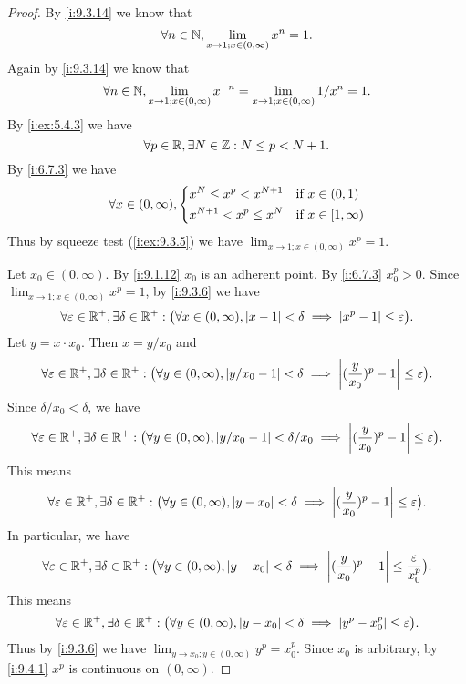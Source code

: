 \begin{proof}
  By \cref{i:9.3.14} we know that
  \[
    \forall n \in \mathbb{N}, \lim_{x \to 1 ; x \in (0, \infty)} x^n = 1.
  \]
  Again by \cref{i:9.3.14} we know that
  \[
    \forall n \in \mathbb{N}, \lim_{x \to 1 ; x \in (0, \infty)} x^{-n} = \lim_{x \to 1 ; x \in (0, \infty)} 1 / x^n = 1.
  \]
  By \cref{i:ex:5.4.3} we have
  \[
    \forall p \in \mathbb{R}, \exists N \in \mathbb{Z} : N \leq p < N + 1.
  \]
  By \cref{i:6.7.3} we have
  \[
    \forall x \in (0, \infty), \begin{dcases}
      x^N \leq x^p < x^{N + 1}   & \text{if } x \in (0, 1)      \\
      x^{N + 1} < x^p \leq x^{N} & \text{if } x \in [1, \infty)
    \end{dcases}
  \]
  Thus by squeeze test (\cref{i:ex:9.3.5}) we have \(\lim_{x \to 1 ; x \in (0, \infty)} x^p = 1\).

  Let \(x_0 \in (0, \infty)\).
  By \cref{i:9.1.12} \(x_0\) is an adherent point.
  By \cref{i:6.7.3} \(x_0^p > 0\).
  Since \(\lim_{x \to 1 ; x \in (0, \infty)} x^p = 1\), by \cref{i:9.3.6} we have
  \[
    \forall \varepsilon \in \mathbb{R}^+, \exists \delta \in \mathbb{R}^+ : \big(\forall x \in (0, \infty), \left\lvert x - 1\right\rvert < \delta \implies \left\lvert x^p - 1\right\rvert \leq \varepsilon\big).
  \]
  Let \(y = x \cdot x_0\).
  Then \(x = y / x_0\) and
  \[
    \forall \varepsilon \in \mathbb{R}^+, \exists \delta \in \mathbb{R}^+ : \big(\forall y \in (0, \infty), \left\lvert y / x_0 - 1\right\rvert < \delta \implies \left\lvert(\dfrac{y}{x_0})^p - 1\right\rvert \leq \varepsilon\big).
  \]
  Since \(\delta / x_0 < \delta\), we have
  \[
    \forall \varepsilon \in \mathbb{R}^+, \exists \delta \in \mathbb{R}^+ : \big(\forall y \in (0, \infty), \left\lvert y / x_0 - 1\right\rvert < \delta / x_0 \implies \left\lvert(\dfrac{y}{x_0})^p - 1\right\rvert \leq \varepsilon\big).
  \]
  This means
  \[
    \forall \varepsilon \in \mathbb{R}^+, \exists \delta \in \mathbb{R}^+ : \big(\forall y \in (0, \infty), \left\lvert y - x_0\right\rvert < \delta \implies \left\lvert(\dfrac{y}{x_0})^p - 1\right\rvert \leq \varepsilon\big).
  \]
  In particular, we have
  \[
    \forall \varepsilon \in \mathbb{R}^+, \exists \delta \in \mathbb{R}^+ : \big(\forall y \in (0, \infty), \left\lvert y - x_0\right\rvert < \delta \implies \left\lvert(\dfrac{y}{x_0})^p - 1\right\rvert \leq \dfrac{\varepsilon}{x_0^p}\big).
  \]
  This means
  \[
    \forall \varepsilon \in \mathbb{R}^+, \exists \delta \in \mathbb{R}^+ : \big(\forall y \in (0, \infty), \left\lvert y - x_0\right\rvert < \delta \implies \left\lvert y^p - x_0^p\right\rvert \leq \varepsilon\big).
  \]
  Thus by \cref{i:9.3.6} we have \(\lim_{y \to x_0 ; y \in (0, \infty)} y^p = x_0^p\).
  Since \(x_0\) is arbitrary, by \cref{i:9.4.1} \(x^p\) is continuous on \((0, \infty)\).
\end{proof}

